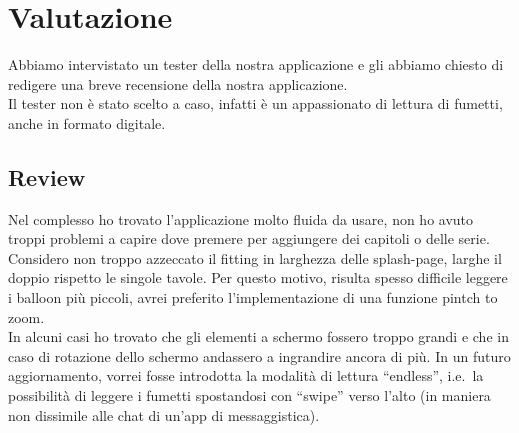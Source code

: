 \documentclass[../Assignment-3-LPSMT.tex]{subfiles}
\begin{document}
\chapter{Valutazione}

Abbiamo intervistato un tester della nostra applicazione e gli abbiamo chiesto di redigere una breve recensione della nostra applicazione.\\
Il tester non è stato scelto a caso, infatti è un appassionato di lettura di fumetti, anche in formato digitale.

\section{Review}

Nel complesso ho trovato l'applicazione molto fluida da usare, non ho avuto troppi problemi a capire dove premere per aggiungere dei capitoli o delle serie.\\
Considero non troppo azzeccato il fitting in larghezza delle splash-page, larghe il doppio rispetto le singole tavole. Per questo motivo, risulta spesso difficile leggere i balloon più piccoli, avrei preferito l'implementazione di una funzione pintch to zoom.\\
In alcuni casi ho trovato che gli elementi a schermo fossero troppo grandi e che in caso di rotazione dello schermo andassero a ingrandire ancora di più.
In un futuro aggiornamento, vorrei fosse introdotta la modalità di lettura ``endless'', i.e.\ la possibilità di leggere i fumetti spostandosi con ``swipe'' verso l'alto (in maniera non dissimile alle chat di un'app di messaggistica).\\
\end{document}

